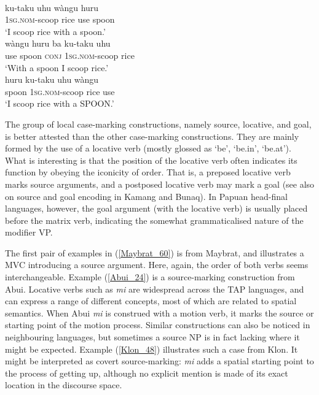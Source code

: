 \ea 
{}\\
\ea \label{Kambera_22a}
\gll ku-taku uhu wàngu huru \\
1\textsc{sg}.\textsc{nom}-scoop rice use spoon \\
\glft `I scoop rice with a spoon.' \\ 
\ex \label{Kambera_22b}
\gll wàngu huru ba ku-taku uhu \\
use spoon \textsc{conj} 1\textsc{sg}.\textsc{nom}-scoop rice \\
\glft `With a spoon I scoop rice.' \\ 
\ex \label{Kambera_22c}
\gll huru ku-taku uhu wàngu \\ 
spoon 1\textsc{sg}.\textsc{nom}-scoop rice use \\
\glft `I scoop rice with a SPOON.'\\ 
\z
\z

The group of local case-marking constructions, namely source, locative, and goal, is better attested than the other case-marking constructions. They are mainly formed by the use of a locative verb (mostly glossed as `be', `be.in', `be.at'). What is interesting is that the position of the locative verb often indicates its function by obeying the iconicity of order. That is, a preposed locative verb marks source arguments, and a postposed locative verb may mark a goal (see also \citealt{schapper2011iconicity} on source and goal encoding in Kamang and Bunaq). In Papuan head-final languages, however, the goal argument (with the locative verb) is usually placed before the matrix verb, indicating the somewhat grammaticalised nature of the modifier VP.

The first pair of examples in (\ref{Maybrat_60}) is from Maybrat, and illustrates a MVC introducing a source argument. Here, again, the order of both verbs seems interchangeable. Example (\ref{Abui_24}) is a source-marking construction from Abui. Locative verbs such as \textit{mi} are widespread across the TAP languages, and can express a range of different concepts, most of which are related to spatial semantics. When Abui \textit{mi} is construed with a motion verb, it marks the source or starting point of the motion process. Similar constructions can also be noticed in neighbouring languages, but sometimes a source NP is in fact lacking where it might be expected. Example (\ref{Klon_48}) illustrates such a case from Klon. It might be interpreted as covert source-marking: \textit{mi} adds a spatial starting point to the process of getting up, although no explicit mention is made of its exact location in the discourse space.

